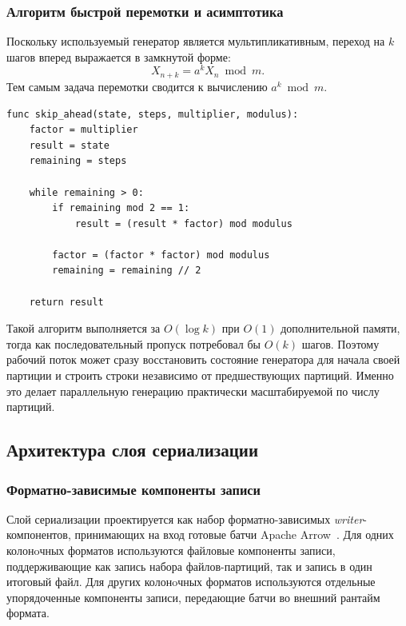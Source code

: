 \subsubsection{Алгоритм быстрой перемотки и асимптотика}

Поскольку используемый генератор является мультипликативным, переход на $k$
шагов вперед выражается в замкнутой форме:
\begin{equation}
    X_{n+k} = a^k X_n \bmod m.
\end{equation}
Тем самым задача перемотки сводится к вычислению $a^k \bmod m$.

\begin{lstlisting}[style=reportpseudocodeinline,caption={Перемотка линейного генератора}]
func skip_ahead(state, steps, multiplier, modulus):
    factor = multiplier
    result = state
    remaining = steps

    while remaining > 0:
        if remaining mod 2 == 1:
            result = (result * factor) mod modulus

        factor = (factor * factor) mod modulus
        remaining = remaining // 2

    return result
\end{lstlisting}

Такой алгоритм выполняется за $O(\log k)$ при $O(1)$ дополнительной памяти,
тогда как последовательный пропуск потребовал бы $O(k)$ шагов. Поэтому рабочий
поток может сразу восстановить состояние генератора для начала своей партиции и
строить строки независимо от предшествующих партиций. Именно это делает
параллельную генерацию практически масштабируемой по числу партиций.

\subsection{Архитектура слоя сериализации}

\subsubsection{Форматно-зависимые компоненты записи}

Слой сериализации проектируется как набор форматно-зависимых
\textit{writer}-компонентов, принимающих на вход готовые батчи
Apache Arrow~\cite{apache-arrow}. Для одних колонoчных форматов
используются файловые компоненты записи, поддерживающие как запись набора
файлов-партиций, так и запись в один итоговый файл. Для других колонoчных
форматов используются отдельные упорядоченные компоненты записи, передающие
батчи во внешний рантайм формата.

